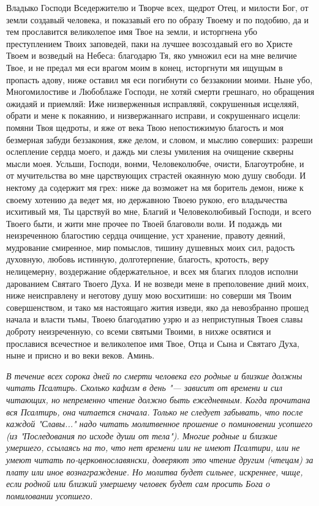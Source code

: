 Владыко Господи Вседержителю и Творче всех, щедрот Отец, и милости Бог, от земли создавый человека, и показавый его по образу Твоему и по подобию, да и тем прославится великолепое имя Твое на земли, и исторгнена убо преступлением Твоих заповедей, паки на лучшее возсоздавый его во Христе Твоем и возведый на Небеса: благодарю Тя, яко умножил еси на мне величие Твое, и не предал мя еси врагом моим в конец, исторгнути мя ищущым в пропасть адову, ниже оставил мя еси погибнути со беззаконии моими. Ныне убо, Многомилостиве и Любоблаже Господи, не хотяй смерти грешнаго, но обращения ожидаяй и приемляй: Иже низверженныя исправляяй, сокрушенныя исцеляяй, обрати и мене к покаянию, и низвержаннаго исправи, и сокрушеннаго исцели: помяни Твоя щедроты, и яже от века Твою непостижимую благость и моя безмерная забуди беззакония, яже делом, и словом, и мыслию соверших: разреши ослепление сердца моего, и даждь ми слезы умиления на очищение скверны мысли моея. Усльши, Господи, вонми, Человеколюбче, очисти, Благоутробне, и от мучительства во мне царствующих страстей окаянную мою душу свободи. И нектому да содержит мя грех: ниже да возможет на мя боритель демон, ниже к своему хотению да ведет мя, но державною Твоею рукою, его владычества исхитивый мя, Ты царствуй во мне, Благий и Человеколюбивый Господи, и всего Твоего быти, и жити мне прочее по Твоей благоволи воли. И подаждь ми неизреченною благостию сердца очищение, уст хранение, правоту деяний, мудрование смиренное, мир помыслов, тишину душевных моих сил, радость духовную, любовь истинную, долготерпение, благость, кротость, веру нелицемерну, воздержание обдержательное, и всех мя благих плодов исполни дарованием Святаго Твоего Духа. И не возведи мене в преполовение дний моих, ниже неисправлену и неготову душу мою восхитиши: но соверши мя Твоим совершенством, и тако мя настоящаго жития изведи, яко да невозбранно прошед начала и власти тьмы, Твоею благодатию узрю и аз неприступныя Твоея славы доброту неизреченную, со всеми святыми Твоими, в нихже освятися и прославися всечестное и великолепое имя Твое, Отца и Сына и Святаго Духа, ныне и присно и во веки веков. Аминь.


\mychapterending

 


\itshape В течение всех сорока дней по смерти человека его родные и близкие должны читать Псалтирь. Сколько кафизм в день "--- зависит от времени и сил читающих, но непременно чтение должно быть ежедневным. Когда прочитана вся Псалтирь, она читается сначала. Только не следует забывать, что после каждой "Славы..." надо читать молитвенное прошение о поминовении усопшего (из "Последования по исходе души от тела"). Многие родные и близкие умершего, ссылаясь на то, что нет времени или не имеют Псалтири, или не умеют читать по-церковнославянски, доверяют это чтение другим (чтецам) за плату или иное вознаграждение. Но молитва будет сильнее, искреннее, чище, если родной или близкий умершему человек будет сам просить Бога о помиловании усопшего. 

